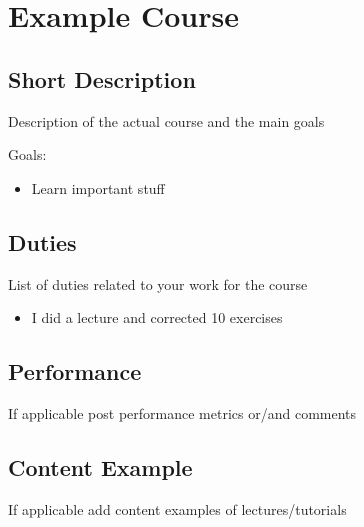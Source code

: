 \section{Example Course}



\subsection{Short Description}
Description of the actual course and the main goals

Goals:
\begin{itemize}

\item Learn important stuff

\end{itemize}

\subsection{Duties}
List of duties related to your work for the course
\begin{itemize}
    \item I did a lecture and corrected 10 exercises
\end{itemize}

\subsection{Performance}
If applicable post performance metrics or/and comments

\subsection{Content Example}

If applicable add content examples of lectures/tutorials

\clearpage